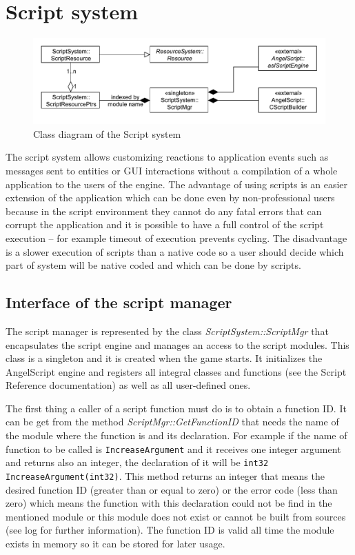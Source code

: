 \documentclass[a4paper, 12pt]{report}
\begin{document}
\chapter{Script system}

\begin{figure}[htbp]
	\centering
		\includegraphics[width=1\textwidth]{ScriptSystemClassDiagram.pdf}
	\caption{Class diagram of the Script system}
	\label{fig:scriptsystem-diagram}
\end{figure}

The script system allows customizing reactions to application events such as messages sent to entities or GUI interactions without a compilation of a whole application to the users of the engine. The advantage of using scripts is an easier extension of the application which can be done even by non-professional users because in the script environment they cannot do any fatal errors that can corrupt the application and it is possible to have a full control of the script execution -- for example timeout of execution prevents cycling. The disadvantage is a slower execution of scripts than a native code so a user should decide which part of system will be native coded and which can be done by scripts.

\section{Interface of the script manager}

The script manager is represented by the class \emph{ScriptSystem::ScriptMgr} that encapsulates the script engine and manages an access to the script modules. This class is a singleton and it is created when the game starts. It initializes the AngelScript engine and registers all integral classes and functions (see the Script Reference documentation) as well as all user-defined ones.

The first thing a caller of a script function must do is to obtain a function ID. It can be get from the method \emph{ScriptMgr::GetFunctionID} that needs the name of the module where the function is and its declaration. For example if the name of function to be called is \verb/IncreaseArgument/ and it receives one integer argument and returns also an integer, the declaration of it will be \verb/int32 IncreaseArgument(int32)/. This method returns an integer that means the desired function ID (greater than or equal to zero) or the error code (less than zero) which means the function with this declaration could not be find in the mentioned module or this module does not exist or cannot be built from sources (see log for further information). The function ID is valid all time the module exists in memory so it can be stored for later usage.
\end{document}
